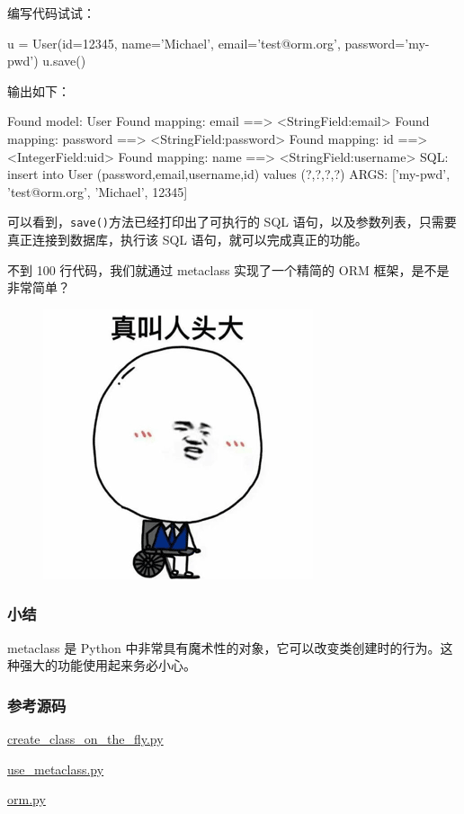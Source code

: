 编写代码试试：

\begin{pythoncode}
u = User(id=12345, name='Michael', email='test@orm.org', password='my-pwd')
u.save()
\end{pythoncode}

输出如下：

\begin{pythoncode}
Found model: User
Found mapping: email ==> <StringField:email>
Found mapping: password ==> <StringField:password>
Found mapping: id ==> <IntegerField:uid>
Found mapping: name ==> <StringField:username>
SQL: insert into User (password,email,username,id) values (?,?,?,?)
ARGS: ['my-pwd', 'test@orm.org', 'Michael', 12345]
\end{pythoncode}

可以看到，\texttt{save()}方法已经打印出了可执行的 SQL
语句，以及参数列表，只需要真正连接到数据库，执行该 SQL
语句，就可以完成真正的功能。

不到 100 行代码，我们就通过 metaclass 实现了一个精简的 ORM
框架，是不是非常简单？

 
 \begin{figure}[htp]
	\centering
	\includegraphics[width=0.6\linewidth]{fig/1183103158580480l.png}
\end{figure}


\hypertarget{ux5c0fux7ed3}{%
\subsubsection{小结}\label{ux5c0fux7ed3}}

metaclass 是 Python
中非常具有魔术性的对象，它可以改变类创建时的行为。这种强大的功能使用起来务必小心。

\hypertarget{ux53c2ux8003ux6e90ux7801}{%
\subsubsection{参考源码}\label{ux53c2ux8003ux6e90ux7801}}

\href{https://github.com/michaelliao/learn-python3/blob/master/samples/oop_advance/create_class_on_the_fly.py}{create\_class\_on\_the\_fly.py}

\href{https://github.com/michaelliao/learn-python3/blob/master/samples/oop_advance/use_metaclass.py}{use\_metaclass.py}

\href{https://github.com/michaelliao/learn-python3/blob/master/samples/oop_advance/orm.py}{orm.py}


